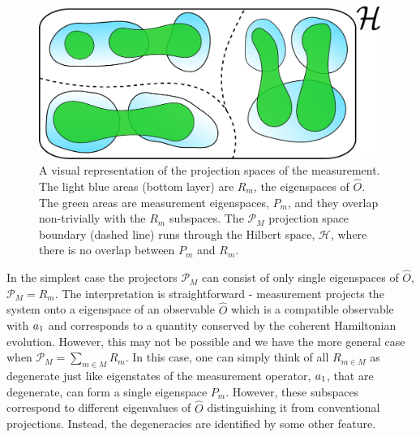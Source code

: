 \begin{figure}[hbtp!]
	\includegraphics[width=\linewidth]{spaces}
	\caption[A Visual Representation of the Projection Spaces of
        the Measurement]{A visual representation of the projection
          spaces of the measurement. The light blue areas (bottom
          layer) are $R_m$, the eigenspaces of $\hat{O}$. The green
          areas are measurement eigenspaces, $P_m$, and they overlap
          non-trivially with the $R_m$ subspaces. The $\mathcal{P}_M$
          projection space boundary (dashed line) runs through the
          Hilbert space, $\mathcal{H}$, where there is no overlap
          between $P_m$ and $R_m$.  \label{fig:spaces}}
\end{figure}

In the simplest case the projectors $\mathcal{P}_M$ can consist of
only single eigenspaces of $\hat{O}$, $\mathcal{P}_M = R_m$. The
interpretation is straightforward - measurement projects the system
onto a eigenspace of an observable $\hat{O}$ which is a compatible
observable with $a_1$ and corresponds to a quantity conserved by the
coherent Hamiltonian evolution. However, this may not be possible and
we have the more general case when
$\mathcal{P}_M = \sum_{m \in M} R_m$. In this case, one can simply
think of all $R_{m \in M}$ as degenerate just like eigenstates of the
measurement operator, $a_1$, that are degenerate, can form a single
eigenspace $P_m$. However, these subspaces correspond to different
eigenvalues of $\hat{O}$ distinguishing it from conventional
projections. Instead, the degeneracies are identified by some other
feature.

